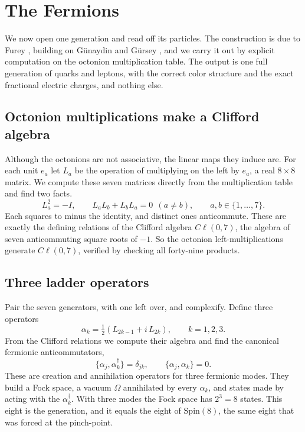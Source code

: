 \section{The Fermions} \label{sec:fermions}

We now open one generation and read off its particles. The construction is due to Furey \cite{furey2018}, building on
G{\"u}naydin and Gürsey \cite{gunaydin1973}, and we carry it out by explicit computation on the octonion multiplication
table. The output is one full generation of quarks and leptons, with the correct color structure and the exact
fractional electric charges, and nothing else.

\subsection{Octonion multiplications make a Clifford algebra}

Although the octonions are not associative, the linear maps they induce are. For each unit $e_a$ let $L_a$ be the
operation of multiplying on the left by $e_a$, a real $8 \times 8$ matrix. We compute these seven matrices directly
from the multiplication table and find two facts.
\begin{equation}
  L_a^2 = -I, \qquad L_a L_b + L_b L_a = 0 \ \ (a \neq b), \qquad a, b \in \{1, \dots, 7\}.
\end{equation}
Each squares to minus the identity, and distinct ones anticommute. These are exactly the defining relations of the
Clifford algebra $C\ell(0,7)$, the algebra of seven anticommuting square roots of $-1$. So the octonion left-multiplications
generate $C\ell(0,7)$, verified by checking all forty-nine products.

\subsection{Three ladder operators}

Pair the seven generators, with one left over, and complexify. Define three operators
\begin{equation}
  \alpha_k = \tfrac12\left(L_{2k-1} + i\,L_{2k}\right), \qquad k = 1, 2, 3 .
\end{equation}
From the Clifford relations we compute their algebra and find the canonical fermionic anticommutators,
\begin{equation}
  \{\alpha_j, \alpha_k^\dagger\} = \delta_{jk}, \qquad \{\alpha_j, \alpha_k\} = 0 .
\end{equation}
These are creation and annihilation operators for three fermionic modes. They build a Fock space, a vacuum $\Omega$
annihilated by every $\alpha_k$, and states made by acting with the $\alpha_k^\dagger$. With three modes the Fock
space has $2^3 = 8$ states. This eight is the generation, and it equals the eight of $\mathrm{Spin}(8)$, the same eight
that was forced at the pinch-point.

